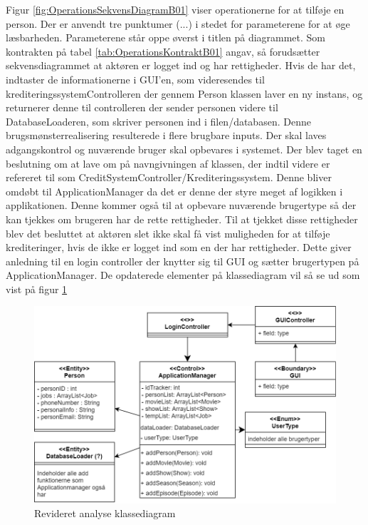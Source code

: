 Figur \ref{fig:OperationsSekvensDiagramB01} viser operationerne for at tilføje en person. Der er anvendt tre punktumer (...) i stedet for parameterene for at øge læsbarheden. Parameterene står oppe øverst i titlen på diagrammet. Som kontrakten på tabel \ref{tab:OperationsKontraktB01} angav, så forudsætter sekvensdiagrammet at aktøren er logget ind og har rettigheder. Hvis de har det, indtaster de informationerne i GUI'en, som videresendes til krediteringssystemControlleren der gennem Person klassen laver en ny instans, og returnerer denne til controlleren der sender personen videre til DatabaseLoaderen, som skriver personen ind i filen/databasen.
Denne brugsmønsterrealisering resulterede i flere brugbare inputs. Der skal laves adgangskontrol og nuværende bruger skal opbevares i systemet. Der blev taget en beslutning om at lave om på navngivningen af klassen, der indtil videre er refereret til som CreditSystemController/Krediteringssystem. Denne bliver omdøbt til ApplicationManager da det er denne der styre meget af logikken i applikationen. Denne kommer også til at opbevare nuværende brugertype så der kan tjekkes om brugeren har de rette rettigheder. Til at tjekket disse rettigheder blev det besluttet at aktøren slet ikke skal få vist muligheden for at tilføje krediteringer, hvis de ikke er logget ind som en der har rettigheder. Dette giver anledning til en login controller der knytter sig til GUI og sætter brugertypen på ApplicationManager. De opdaterede elementer på klassediagram vil så se ud som vist på figur \ref{fig:AnalyseKlasseDiagramV2}


\begin{figure}[H]
    \centering
    \includegraphics[scale = 0.33]{images/AnalyseKlasseDiagramV2.png}
    \caption{Revideret analyse klassediagram}
    \label{fig:AnalyseKlasseDiagramV2}
\end{figure}

